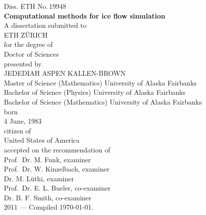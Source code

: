 \begin{titlepage}
  \begin{center}
    \large
    Diss. ETH No.\,19948\\
    \vspace{2.0cm} 
    \LARGE
    \textbf{
      Computational methods for ice flow simulation
    }
    \large
    \\    
    \vspace{1.5cm}
    A dissertation submitted to\\[0.5em]

    ETH Z\"URICH \\[2.0em]


    for the degree of \\[0.5em]

    Doctor of Sciences\\[3.0em]


    presented by \\[0.5em]

    JEDEDIAH ASPEN KALLEN-BROWN \\[0.5em]

    Master of Science (Mathematics) University of Alaska Fairbanks \\
    Bachelor of Science (Physics) University of Alaska Fairbanks \\
    Bachelor of Science (Mathematics) University of Alaska Fairbanks \\[2.0em]

    born\\[0.5em]
    4 June, 1983\\[2.0em]

    citizen of\\[0.5em]

    United States of America\\[3.0em]



    accepted on the recommendation of\\[1.0em]

    Prof.~Dr. M. Funk, examiner\\[0.5em]

    Prof.~Dr. W. Kinzelbach, examiner\\[0.5em]

    Dr. M. L\"uthi, examiner\\[0.5em]

    Prof.~Dr. E. L. Bueler, co-examiner\\[0.5em]

    Dr. B. F. Smith, co-examiner\\[5.0em]

    2011 --- Compiled \today.\\
  \end{center}
\end{titlepage}


